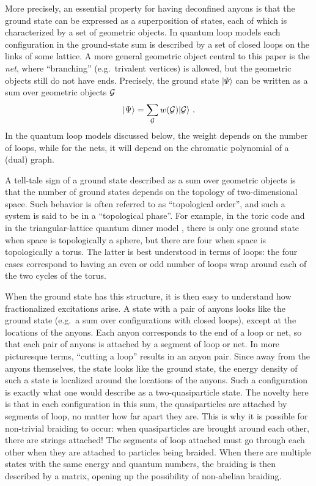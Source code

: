 \documentclass[11pt]{article}
\begin{document}
More precisely, an essential property for having deconfined anyons is
that the ground state can be expressed as a superposition of
states, each of which is characterized by a set of
geometric objects. In
quantum loop models each configuration in the ground-state sum is
described by a set of closed loops on the links of some lattice.  A
more general geometric object central to this paper is the {\em net},
where ``branching'' (e.g.\ trivalent vertices) is allowed, but the
geometric objects still do not have ends.  Precisely, the ground state
$|\Psi\rangle$ can be written as a sum over geometric
objects ${\cal G}$
\begin{equation}
|\Psi\rangle = \sum_{\cal G} w({\cal G}) |{\cal G}\rangle\ .
\label{PsiG}
\end{equation}
In the quantum loop models discussed below, the weight
depends on the number of loops, while for the nets, it will depend on
the chromatic polynomial of a (dual) graph. 


A tell-tale sign of a ground state described as a sum over geometric
objects is that the number of ground states
depends on the topology of two-dimensional space. Such behavior is
often referred to as ``topological order'', and such a system is said
to be in a ``topological phase''. For example, in the toric code and
in the triangular-lattice quantum dimer model \cite{RK}, there is only one
ground state when space is topologically a sphere, but there are four
when space is topologically a torus. The latter is best understood in
terms of loops: the four cases correspond to having an even or odd
number of loops wrap around each of the two cycles of the torus.


When the ground state has this structure, it is then easy to
understand how fractionalized excitations arise. 
A state with a pair of anyons looks like the ground state (e.g.\ a sum
over configurations with closed loops), except at the locations of the
anyons. Each anyon corresponds to the end of a loop or net, so that
each pair of anyons is attached by a segment of loop or net. In more
picturesque terms, ``cutting a loop'' results in an anyon pair. Since
away from the anyons themselves, the state looks like the ground
state, the energy density of such a state is localized around the
locations of the anyons. Such a configuration is exactly what one
would describe as a two-quasiparticle state. The novelty here is that
in each configuration in this sum, the quasiparticles are attached by
segments of loop, no matter how far apart they are. This is why it is
possible for non-trivial braiding to occur: when quasiparticles are
brought around each other, there are strings attached! The segments of
loop attached must go through each other when they are attached to
particles being braided. When there are multiple states with the same
energy and quantum numbers, the braiding is then described by a
matrix, opening up the possibility of non-abelian braiding.
\end{document}
